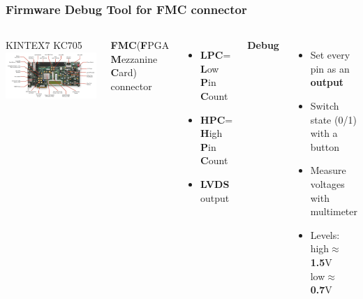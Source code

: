 \documentclass[aspectratio=169]{beamer}
\begin{document}
	\begin{frame}
		\frametitle{Firmware Debug Tool for FMC connector}
		\begin{columns}
			\begin{center}
				{\color{blue} KINTEX7 KC705}
				\includegraphics[width=1.0 \textwidth]{IMG/KC705.PNG}
			\end{center}
			\textbf{FMC}{\tiny (\textbf{F}PGA \textbf{M}ezzanine \textbf{C}ard)} connector
			\begin{itemize}
				\item \textbf{LPC}= \textbf{L}ow \textbf{P}in \textbf{C}ount
				\item \textbf{HPC}= \textbf{H}igh \textbf{P}in \textbf{C}ount
				\item \textbf{LVDS} output 
			\end{itemize}
			\textbf{Debug}
			\begin{itemize}
				\item Set every pin as an \textbf{output}
				\item Switch state (0/1) with a button
				\item Measure voltages with multimeter
				\item Levels: high$\approx$\textbf{1.5}V \\ low$\approx$\textbf{0.7}V
			\end{itemize}
		\end{columns}
	\end{frame}
\end{document}
